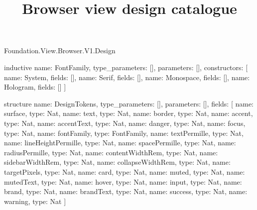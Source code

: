 \begin{lexlean}{Foundation.View.Browser.V1.Design}
\title{Browser view design catalogue}
\begin{semanticmodule}
inductive{
  name: FontFamily,
  type_parameters: [],
  parameters: [],
  constructors: [
    {name: System, fields: []},
    {name: Serif, fields: []},
    {name: Monospace, fields: []},
    {name: Hologram, fields: []}
  ]
}

structure{
  name: DesignTokens,
  type_parameters: [],
  parameters: [],
  fields: [
    {name: surface, type: Nat},
    {name: text, type: Nat},
    {name: border, type: Nat},
    {name: accent, type: Nat},
    {name: accentText, type: Nat},
    {name: danger, type: Nat},
    {name: focus, type: Nat},
    {name: fontFamily, type: FontFamily},
    {name: textPermille, type: Nat},
    {name: lineHeightPermille, type: Nat},
    {name: spacePermille, type: Nat},
    {name: radiusPermille, type: Nat},
    {name: contentWidthRem, type: Nat},
    {name: sidebarWidthRem, type: Nat},
    {name: collapseWidthRem, type: Nat},
    {name: targetPixels, type: Nat},
    {name: card, type: Nat},
    {name: muted, type: Nat},
    {name: mutedText, type: Nat},
    {name: hover, type: Nat},
    {name: input, type: Nat},
    {name: brand, type: Nat},
    {name: brandText, type: Nat},
    {name: success, type: Nat},
    {name: warning, type: Nat}
  ]
}


\end{semanticmodule}
\end{lexlean}
